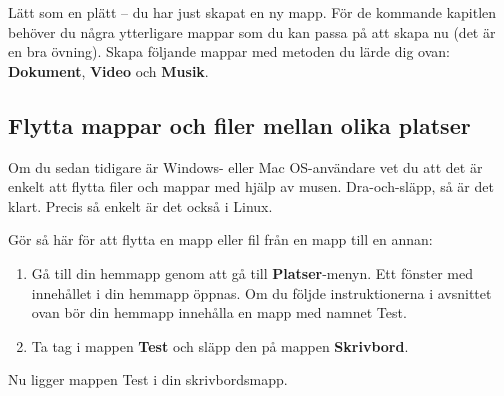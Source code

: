 \documentclass[a4paper,final]{memoir} %
\begin{document}
Lätt som en plätt -- du har just skapat en ny mapp. För de kommande kapitlen behöver du några ytterligare mappar som du kan passa på att skapa nu (det är en bra övning). Skapa följande mappar med metoden du lärde dig ovan: \textbf{Dokument}, \textbf{Video}\label{videomapp} och \textbf{Musik}\label{musikmapp}.



\subsection{Flytta mappar och filer mellan olika platser}


Om du sedan tidigare är Windows- eller Mac OS-användare vet du att det är enkelt att flytta filer och mappar med hjälp av musen. Dra-och-släpp, så är det klart. Precis så enkelt är det också i Linux.

Gör så här för att flytta en mapp eller fil från en mapp till en annan:

\begin{enumerate}

\item Gå till din hemmapp genom att gå till \textbf{Platser}-menyn. Ett fönster med innehållet i din hemmapp öppnas. Om du följde instruktionerna i avsnittet ovan bör din hemmapp innehålla en mapp med namnet Test. 
\item Ta tag i mappen \textbf{Test} och släpp den på mappen \textbf{Skrivbord}. 

\end{enumerate}

Nu ligger mappen Test i din skrivbordsmapp.
\end{document}
